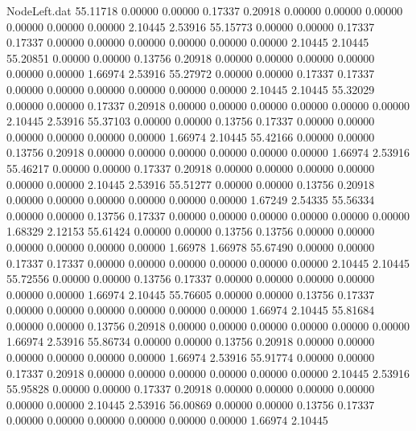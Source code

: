 \begin{filecontents}{NodeLeft.dat}
  55.11718    0.00000    0.00000     0.17337    0.20918    0.00000    0.00000    0.00000    0.00000    0.00000    0.00000    2.10445    2.53916
  55.15773    0.00000    0.00000     0.17337    0.17337    0.00000    0.00000    0.00000    0.00000    0.00000    0.00000    2.10445    2.10445
  55.20851    0.00000    0.00000     0.13756    0.20918    0.00000    0.00000    0.00000    0.00000    0.00000    0.00000    1.66974    2.53916
  55.27972    0.00000    0.00000     0.17337    0.17337    0.00000    0.00000    0.00000    0.00000    0.00000    0.00000    2.10445    2.10445
  55.32029    0.00000    0.00000     0.17337    0.20918    0.00000    0.00000    0.00000    0.00000    0.00000    0.00000    2.10445    2.53916
  55.37103    0.00000    0.00000     0.13756    0.17337    0.00000    0.00000    0.00000    0.00000    0.00000    0.00000    1.66974    2.10445
  55.42166    0.00000    0.00000     0.13756    0.20918    0.00000    0.00000    0.00000    0.00000    0.00000    0.00000    1.66974    2.53916
  55.46217    0.00000    0.00000     0.17337    0.20918    0.00000    0.00000    0.00000    0.00000    0.00000    0.00000    2.10445    2.53916
  55.51277    0.00000    0.00000     0.13756    0.20918    0.00000    0.00000    0.00000    0.00000    0.00000    0.00000    1.67249    2.54335
  55.56334    0.00000    0.00000     0.13756    0.17337    0.00000    0.00000    0.00000    0.00000    0.00000    0.00000    1.68329    2.12153
  55.61424    0.00000    0.00000     0.13756    0.13756    0.00000    0.00000    0.00000    0.00000    0.00000    0.00000    1.66978    1.66978
  55.67490    0.00000    0.00000     0.17337    0.17337    0.00000    0.00000    0.00000    0.00000    0.00000    0.00000    2.10445    2.10445
  55.72556    0.00000    0.00000     0.13756    0.17337    0.00000    0.00000    0.00000    0.00000    0.00000    0.00000    1.66974    2.10445
  55.76605    0.00000    0.00000     0.13756    0.17337    0.00000    0.00000    0.00000    0.00000    0.00000    0.00000    1.66974    2.10445
  55.81684    0.00000    0.00000     0.13756    0.20918    0.00000    0.00000    0.00000    0.00000    0.00000    0.00000    1.66974    2.53916
  55.86734    0.00000    0.00000     0.13756    0.20918    0.00000    0.00000    0.00000    0.00000    0.00000    0.00000    1.66974    2.53916
  55.91774    0.00000    0.00000     0.17337    0.20918    0.00000    0.00000    0.00000    0.00000    0.00000    0.00000    2.10445    2.53916
  55.95828    0.00000    0.00000     0.17337    0.20918    0.00000    0.00000    0.00000    0.00000    0.00000    0.00000    2.10445    2.53916
  56.00869    0.00000    0.00000     0.13756    0.17337    0.00000    0.00000    0.00000    0.00000    0.00000    0.00000    1.66974    2.10445

\end{filecontents}
